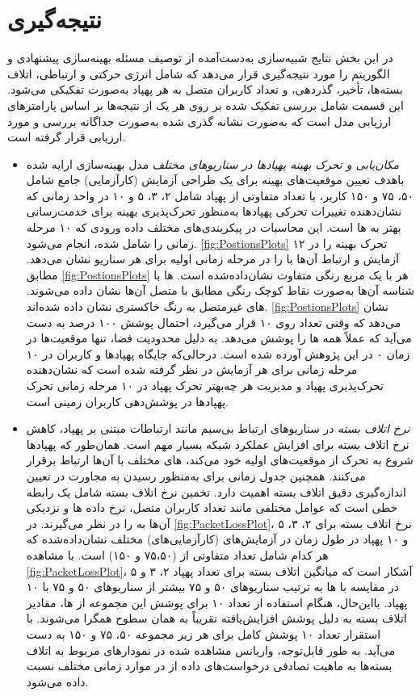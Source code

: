 \section{نتیجه‌گیری}
در این بخش نتایج شبیه‌سازی به‌دست‌آمده از توصیف مسئله بهینه‌سازی پیشنهادی و الگوریتم را مورد نتیجه‌گیری قرار می‌دهد که شامل انرژی حرکتی و ارتباطی، اتلاف بسته‌ها، تأخیر، گذردهی، و تعداد کاربران متصل به هر پهپاد به‌صورت تفکیکی می‌شود. این قسمت شامل بررسی تفکیک شده بر روی هر یک از نتیجه‌ها بر اساس پارامترهای ارزیابی مدل است که به‌صورت نشانه گذری شده به‌صورت جداگانه بررسی و مورد ارزیابی قرار گرفته است.
\begin{itemize}
	\item \textit{مکان‌یابی و تحرک بهینه پهپادها در سناریوهای مختلف}
	مدل بهینه‌سازی ارایه شده باهدف تعیین موقعیت‌های بهینه  برای یک طراحی آزمایش (کارآزمایی) جامع شامل ۵۰، ۷۵ و ۱۵۰ کاربر، با تعداد متفاوتی از پهپاد شامل ۲، ۳، ۵ و ۱۰ در واحد زمانی که نشان‌دهنده تغییرات تحرکی پهپادها به‌منظور تحرک‌پذیری بهینه برای خدمت‌رسانی بهتر به ها است. این محاسبات در پیکربندی‌های مختلف داده ورودی که ۱۰ مرحله زمانی را شامل شده، انجام می‌شود. \autoref{fig:PostionsPlots} تحرک بهینه  را در ۱۲ آزمایش و ارتباط آن‌ها با  را در مرحله زمانی اولیه برای هر سناریو نشان می‌دهد. مطابق \autoref{fig:PostionsPlots} هر  با یک مربع رنگی متفاوت نشان‌داده‌شده است. ها با شناسه آن‌ها به‌صورت نقاط کوچک رنگی مطابق با  متصل آن‌ها نشان داده می‌شوند. های غیرمتصل به رنگ خاکستری نشان داده شده‌اند. \autoref{fig:PostionsPlots} نشان می‌دهد که وقتی تعداد  روی ۱۰ قرار می‌گیرد، احتمال پوشش ۱۰۰ درصد به دست می‌آید که عملاً همه ها را پوشش می‌دهد. به دلیل محدودیت فضا، تنها موقعیت‌ها در زمان ۰ در این پژوهش آورده شده است. درحالی‌که جایگاه پهپادها و کاربران در ۱۰ مرحله زمانی برای هر آزمایش در نظر گرفته شده است که نشان‌دهنده تحرک‌پذیری پهپاد و مدیریت هر چه‌بهتر تحرک پهپاد در ۱۰ مرحله زمانی تحرک پهپادها در پوشش‌دهی کاربران زمینی است.
	\item \textit{نرخ اتلاف بسته}
	در سناریوهای ارتباط بی‌سیم مانند ارتباطات مبتنی بر پهپاد، کاهش نرخ اتلاف بسته برای افزایش عملکرد شبکه بسیار مهم است. همان‌طور که پهپادها شروع به تحرک از موقعیت‌های اولیه خود می‌کند، های مختلف با آن‌ها ارتباط برقرار می‌کنند. همچنین جدول زمانی برای  به‌منظور رسیدن به مجاورت  در تعیین اندازه‌گیری دقیق اتلاف بسته اهمیت دارد. تخمین نرخ اتلاف بسته شامل یک رابطه خطی است که عوامل مختلفی مانند تعداد کاربران متصل، نرخ داده ها و نزدیکی آن‌ها به  را در نظر می‌گیرند. در \autoref{fig:PacketLossPlot}، نرخ اتلاف بسته برای ۲، ۳، ۵ و ۱۰ پهپاد در طول زمان در آزمایش‌های (کارآزمایی‌های) مختلف نشان‌داده‌شده که هر کدام شامل تعداد متفاوتی از  (۷۵،۵۰ و ۱۵۰) است. با مشاهده \autoref{fig:PacketLossPlot}، آشکار است که میانگین اتلاف بسته برای تعداد پهپاد ۲، ۳ و ۵ در مقایسه با ها به ترتیب سناریوهای ۵۰ و ۷۵ بیشتر از سناریوهای ۵۰ و ۷۵ با ۱۰ پهپاد. بااین‌حال، هنگام استفاده از تعداد ۱۰  برای پوشش این مجموعه از ها، مقادیر اتلاف بسته به دلیل پوشش افزایش‌یافته تقریباً به همان سطوح همگرا می‌شوند. با استقرار تعداد ۱۰  پوشش کامل برای هر زیر مجموعه ۵۰، ۷۵ و ۱۵۰  به دست می‌آید. به طور قابل‌توجه، واریانس مشاهده شده در نمودارهای مربوط به اتلاف بسته‌ها به ماهیت تصادفی درخواست‌های داده از  در موارد زمانی مختلف نسبت داده می‌شود.

\end{itemize}
